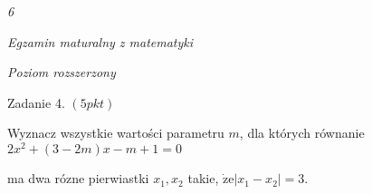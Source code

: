 \documentclass[a4paper,12pt]{article}
\begin{document}
{\it 6}

{\it Egzamin maturalny z matematyki}

{\it Poziom rozszerzony}

Zadanie 4. $(5pkt)$

Wyznacz wszystkie wartości parametru $m$, dla których równanie $2x^{2}+(3-2m)x-m+1=0$

ma dwa rózne pierwiastki $x_{1}, x_{2}$ takie, $\dot{\mathrm{z}}\mathrm{e}|x_{1}-x_{2}|=3.$
\end{document}
